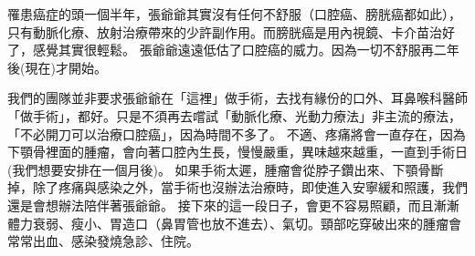 \documentclass[12pt, a4paper]{article}
\begin{document}
罹患癌症的頭一個半年，張爺爺其實沒有任何不舒服（口腔癌、膀胱癌都如此），只有動脈化療、放射治療帶來的少許副作用。而膀胱癌是用內視鏡、卡介苗治好了，感覺其實很輕鬆。
張爺爺遠遠低估了口腔癌的威力。因為一切不舒服再二年後(現在)才開始。

我們的團隊並非要求張爺爺在「這裡」做手術，去找有緣份的口外、耳鼻喉科醫師 「做手術」，都好。只是不須再去嚐試「動脈化療、光動力療法」非主流的療法，「不必開刀可以治療口腔癌」，因為時間不多了。
不適、疼痛將會一直存在，因為下顎骨裡面的腫瘤，會向著口腔內生長，慢慢嚴重，異味越來越重，一直到手術日(我們想要安排在一個月後)。
如果手術太遲，腫瘤會從脖子鑽出來、下顎骨斷掉，除了疼痛與感染之外，當手術也沒辦法治療時，即使進入安寧緩和照護，我們還是會想辦法陪伴著張爺爺。
接下來的這一段日子，會更不容易照顧，而且漸漸體力衰弱、瘦小、胃造口（鼻胃管也放不進去）、氣切。頸部吃穿破出來的腫瘤會常常出血、感染發燒急診、住院。









\end{document}
